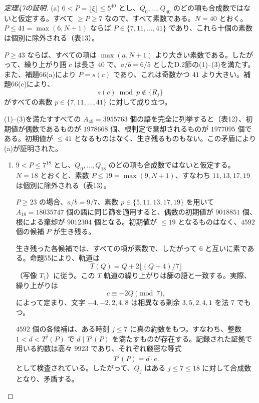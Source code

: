 \documentclass[11pt,reqno]{amsart}
\theoremstyle{definition}
\theoremstyle{definition}
\theoremstyle{remark}
\begin{document}
\begin{proof}[定理47の証明]\leavevmode\label{proof:47}
(a) \(6<P=\lfloor\xi\rfloor\le5^{40}\) とし、\(Q_0,\ldots,Q_{40}\) のどの項も合成数ではないと仮定する。すべて \(\ge P\ge7\) なので、すべて素数である。\(N=40\) とおく。\(P\le41=\max(6,N+1)\) ならば \(P\in\{7,11,\ldots,41\}\) であり、これら十個の素数は個別に除外される（表13）。

\(P\ge43\) ならば、すべての項は \(\max(a,N+1)\) より大きい素数である。したがって、繰り上がり語 \(c\) は長さ \(40\) で、\(a/b=6/5\) としたD.2節の(1)--(3)を満たす。また、補題66(a)により \(P=s(c)\) であり、これは奇数かつ \(41\) より大きい。補題66(c)により、
\[
s(c)\bmod p\notin\{R_j\}
\]
がすべての素数 \(p\in\{7,11,\ldots,41\}\) に対して成り立つ。

(1)--(3)を満たすすべての \(A_{40}=3955763\) 個の語を完全に列挙すると（表12）、初期値が偶数であるものが \(1978668\) 個、根判定で棄却されるものが \(1977095\) 個である。初期値が \(\le41\) となるものはなく、生き残るものもない。この矛盾により(a)が証明された。

\begin{enumerate}
\def\labelenumi{(\alph{enumi})}
\setcounter{enumi}{1}
\item
  \(9<P\le7^{18}\) とし、\(Q_0,\ldots,Q_{18}\) のどの項も合成数ではないと仮定する。\(N=18\) とおくと、素数 \(P\le19=\max(9,N+1)\)、すなわち \(11,13,17,19\) は個別に除外される（表13）。

  \(P\ge23\) の場合、\(a/b=9/7\)、素数 \(p\in\{5,11,13,17,19\}\) を用いて \(A_{18}=18035747\) 個の語に同じ篩を適用すると、偶数の初期値が \(9018851\) 個、根による棄却が \(9012304\) 個となる。初期値が \(\le19\) となるものはなく、\(4592\) 個の候補 \(P\) が生き残る。

  生き残った各候補では、すべての項が素数で、したがって \(6\) と互いに素である。命題55により、軌道は
  \[
  T(Q)=Q+2\lfloor(Q+4)/7\rfloor
  \]
  （写像 \(T_1\)）に従う。この \(T\) 軌道の繰り上がりは篩の語と一致する。実際、繰り上がりは
  \[
  c\equiv-2Q\pmod7,
  \]
  によって定まり、文字 \(-4,-2,2,4,8\) は相異なる剰余 \(3,5,2,4,1\) を法 \(7\) でもつ。

  \(4592\) 個の各候補は、ある時刻 \(j\le7\) に真の約数をもつ。すなわち、整数 \(1<d<T^j(P)\) で \(d\mid T^j(P)\) を満たすものが存在する。記録された証拠で用いる約数は高々 \(9923\) であり、それぞれ厳密な等式
  \[
  T^j(P)=d\cdot e.
  \]
  として検査されている。したがって、\(Q_j\) はある \(j\le7\le18\) に対して合成数となり、矛盾する。\qedhere
\end{enumerate}
\end{proof}
\end{document}
